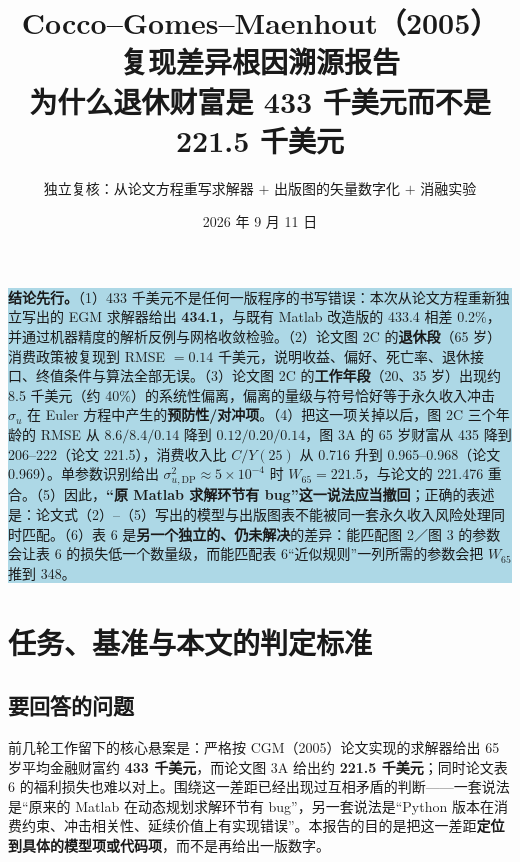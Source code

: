 \documentclass[UTF8,a4paper,11pt,fontset=fandol]{ctexart}
\title{\bfseries Cocco--Gomes--Maenhout（2005）\\复现差异根因溯源报告\\[4pt]
\large 为什么退休财富是 433 千美元而不是 221.5 千美元}
\author{独立复核：从论文方程重写求解器 \(+\) 出版图的矢量数字化 \(+\) 消融实验}
\date{2026 年 9 月 11 日}
\newcommand{\suDP}{\sigma_{u,\mathrm{DP}}^{2}}
\begin{document}
\maketitle

\begin{center}
\colorbox{lightblue}{\parbox{0.93\textwidth}{
\textbf{结论先行。}（1）433 千美元不是任何一版程序的书写错误：本次从论文方程重新独立写出的 EGM 求解器给出 \textbf{434.1}，与既有 Matlab 改造版的 433.4 相差 0.2\%，并通过机器精度的解析反例与网格收敛检验。（2）论文图 2C 的\textbf{退休段}（65 岁）消费政策被复现到 RMSE \(=0.14\) 千美元，说明收益、偏好、死亡率、退休接口、终值条件与算法全部无误。（3）论文图 2C 的\textbf{工作年段}（20、35 岁）出现约 8.5 千美元（约 40\%）的系统性偏离，偏离的量级与符号恰好等于永久收入冲击 \(\sigma_u\) 在 Euler 方程中产生的\textbf{预防性/对冲项}。（4）把这一项关掉以后，图 2C 三个年龄的 RMSE 从 \(8.6/8.4/0.14\) 降到 \(0.12/0.20/0.14\)，图 3A 的 65 岁财富从 435 降到 206--222（论文 221.5），消费收入比 \(C/Y(25)\) 从 0.716 升到 0.965--0.968（论文 0.969）。单参数识别给出 \(\suDP\approx 5\times10^{-4}\) 时 \(W_{65}=221.5\)，与论文的 221.476 重合。（5）因此，\textbf{“原 Matlab 求解环节有 bug”这一说法应当撤回}；正确的表述是：论文式（2）--（5）写出的模型与出版图表不能被同一套永久收入风险处理同时匹配。（6）表 6 是\textbf{另一个独立的、仍未解决}的差异：能匹配图 2／图 3 的参数会让表 6 的损失低一个数量级，而能匹配表 6“近似规则”一列所需的参数会把 \(W_{65}\) 推到 348。}}
\end{center}

\tableofcontents\newpage

\section{任务、基准与本文的判定标准}

\subsection{要回答的问题}
前几轮工作留下的核心悬案是：严格按 CGM（2005）论文实现的求解器给出 65 岁平均金融财富约 \textbf{433 千美元}，而论文图 3A 给出约 \textbf{221.5 千美元}；同时论文表 6 的福利损失也难以对上。围绕这一差距已经出现过互相矛盾的判断——一套说法是“原来的 Matlab 在动态规划求解环节有 bug”，另一套说法是“Python 版本在消费约束、冲击相关性、延续价值上有实现错误”。本报告的目的是把这一差距\textbf{定位到具体的模型项或代码项}，而不是再给出一版数字。
\end{document}

